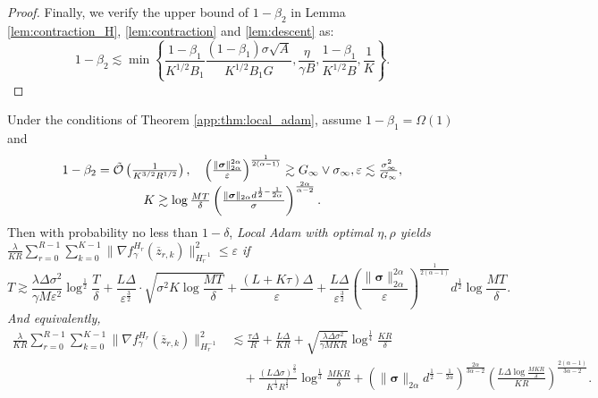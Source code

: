 \documentclass{article} %
\numberwithin{equation}{section}
\begin{document}
\begin{proof}
    Finally, we verify the upper bound of $1-\beta_2$ in Lemma \ref{lem:contraction_H}, \ref{lem:contraction} and \ref{lem:descent} as:
    \begin{equation}
        1-\beta_2 \lesssim \min\left\{\frac{1-\beta_1}{K^{1/2}B_1}\frac{(1-\beta_1)\sigma\sqrt{A}}{K^{1/2}B_1G}, \frac{\eta}{\gamma B}, \frac{1-\beta_1}{K^{1/2}B}, \frac{1}{K}\right\}.
    \end{equation}
\end{proof}

\begin{thm}\label{app:thm:local_adam_1}
    Under the conditions of Theorem \ref{app:thm:local_adam}, assume $1-\beta_1=\Omega(1)$ and
    \begin{equation}
        \begin{array}{c}
            1-\beta_2 = \Tilde{\mathcal{O}} \left(\frac{1}{K^{3/2}R^{1/2}}\right),\quad \left(\frac{\|\boldsymbol{\sigma}\|_{2\alpha}^{2\alpha}}{\varepsilon}\right)^{\frac{1}{2(\alpha-1)}}\gtrsim G_\infty\vee \sigma_\infty, \varepsilon\lesssim \frac{\sigma_\infty^2}{G_\infty},\\
            K\gtrsim \log\frac{MT}{\delta}\left(\frac{\|\boldsymbol{\sigma}\|_{2\alpha}d^{\frac{1}{2}-\frac{1}{2\alpha}}}{\sigma}\right)^{\frac{2\alpha}{\alpha-2}}.
        \end{array}
    \end{equation} 
    Then with probability no less than $1-\delta$, \em Local \em Adam with optimal $\eta,\rho$ yields $\frac{\lambda}{KR}\sum_{r=0}^{R-1}\sum_{k=0}^{K-1}\|\nabla f_\gamma^{H_r}(\overline{z}_{r,k}) \|_{H_r^{-1}}^2 \leq \varepsilon$ if
    \begin{equation}
        T\gtrsim \frac{\lambda\Delta\sigma^2}{\gamma M\varepsilon^2}\log^{\frac{1}{2}}\frac{T}{\delta} + \frac{L\Delta}{\varepsilon^{\frac{3}{2}}}\cdot \sqrt{\sigma^2K\log\frac{MT}{\delta}} + \frac{(L+K\tau)\Delta}{\varepsilon} + \frac{L\Delta}{\varepsilon^{\frac{3}{2}}}\left(\frac{\|\boldsymbol{\sigma}\|_{2\alpha}^{2\alpha}}{\varepsilon}\right)^{\frac{1}{2(\alpha-1)}}d^{\frac{1}{2}}\log\frac{MT}{\delta}.
    \end{equation}
    And equivalently,
    \begin{equation}\label{app:eq:grad_bound_local_adam_1}
        \begin{aligned}
            \frac{\lambda}{KR}\sum_{r=0}^{R-1}\sum_{k=0}^{K-1}\|\nabla f_\gamma^{H_r} (\overline{z}_{r,k}) \|_{H_r^{-1}}^2
            &\lesssim \frac{\tau\Delta}{R} + \frac{L\Delta}{KR} + \sqrt{\frac{\lambda\Delta\sigma^2}{\gamma MKR}}\log^{\frac{1}{4}}\frac{KR}{\delta} \\
            &\quad + \frac{(L\Delta\sigma)^{\frac{2}{3}}}{K^{\frac{1}{3}}R^{\frac{2}{3}}}\log^{\frac{1}{3}}\frac{MKR}{\delta} + \left(\|\boldsymbol{\sigma}\|_{2\alpha}d^{\frac{1}{2}-\frac{1}{2\alpha}}\right)^{\frac{2\alpha}{3\alpha-2}}\left(\frac{L\Delta\log\frac{MKR}{\delta}}{KR}\right)^{\frac{2(\alpha-1)}{3\alpha-2}}.
        \end{aligned}
    \end{equation}
\end{thm}
\end{document}
